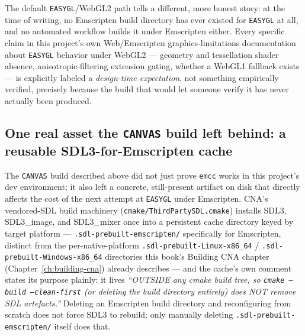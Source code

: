 The default \texttt{EASYGL}/WebGL2 path tells a different, more honest story: at the time of
writing, no Emscripten build directory has ever existed for \texttt{EASYGL} at all, and no
automated workflow builds it under Emscripten either. Every specific claim in this project's
own Web/Emscripten graphics-limitations documentation about \texttt{EASYGL} behavior under
WebGL2 --- geometry and tessellation shader absence, anisotropic-filtering extension gating,
whether a WebGL1 fallback exists --- is explicitly labeled a \emph{design-time expectation},
not something empirically verified, precisely because the build that would let someone verify
it has never actually been produced.

\subsection{One real asset the \texttt{CANVAS} build left behind: a reusable SDL3-for-Emscripten cache}

The \texttt{CANVAS} build described above did not just prove \texttt{emcc} works in this
project's dev environment; it also left a concrete, still-present artifact on disk that
directly affects the cost of the next attempt at \texttt{EASYGL} under Emscripten. CNA's
vendored-SDL build machinery (\texttt{cmake/ThirdPartySDL.cmake}) installs SDL3, SDL3\_image,
and SDL3\_mixer once into a persistent cache directory keyed by target platform ---
\texttt{.sdl-prebuilt-emscripten/} specifically for Emscripten, distinct from the
per-native-platform \texttt{.sdl-prebuilt-Linux-x86\_64} / \texttt{.sdl-prebuilt-Windows-x86\_64}
directories this book's Building CNA chapter (Chapter~\ref{ch:building-cna}) already
describes --- and the cache's own comment states its purpose plainly: it lives
\emph{``OUTSIDE any cmake build tree, so \texttt{cmake --build --clean-first} (or deleting the
build directory entirely) does NOT remove SDL artefacts.''} Deleting an Emscripten build
directory and reconfiguring from scratch does not force SDL3 to rebuild; only manually
deleting \texttt{.sdl-prebuilt-emscripten/} itself does that.

